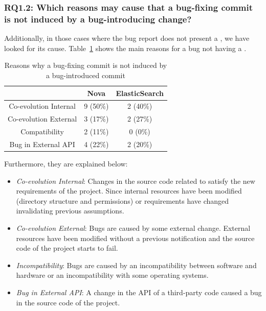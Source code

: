 \documentclass[a4paper, 12pt]{book}
\begin{document}
\subsubsection{RQ1.2: Which reasons may cause that a bug-fixing commit is not induced by a bug-introducing change?}
Additionally, in those cases where the bug report does not present a \BIC, we have looked for its cause. Table~\ref{tablereasosNoBIC} shows the main reasons for a bug not having a \BIC. 
\begin{table}[!t]
	\renewcommand{\arraystretch}{1.3}
	\caption{ Reasons why a bug-fixing commit is not induced by a bug-introduced commit }
	\label{tablereasosNoBIC}
	\centering
	\begin{tabular}{|c|c|c|}
		\hline
  		& Nova & ElasticSearch  \\
		\hline
		\hline
		Co-evolution Internal & 9 (50\%) & 2 (40\%) \\
		\hline
		Co-evolution External  & 3 (17\%) & 2 (27\%)\\
		\hline
		Compatibility & 2 (11\%) & 0 (0\%)\\
		\hline
		Bug in External API & 4 (22\%) & 2 (20\%)\\
		\hline
	\end{tabular}
\end{table}
Furthermore, they are explained below:
\begin{itemize}
 	\item \textit{Co-evolution Internal}: Changes in the source code related to satisfy the new requirements of the project. Since internal resources have been modified (directory structure and permissions) or requirements have changed invalidating previous assumptions.  	
	\item \textit{Co-evolution External}: Bugs are caused by some external change. External resources have been modified without a previous notification and the source code of the project starts to fail.
  	\item \textit{Incompatibility}: Bugs are caused by an incompatibility between software and hardware or an incompatibility with some operating systems.
  	\item \textit{Bug in External API}: A change in the API of a third-party code caused a bug in the source code of the project.
\end{itemize}

\end{document}
